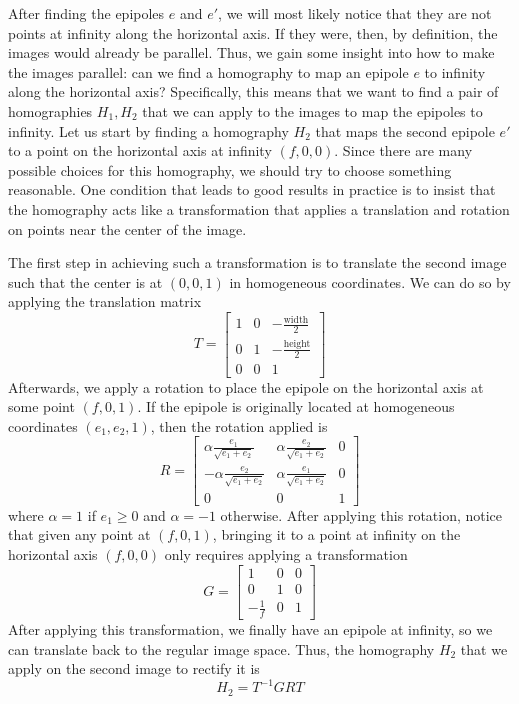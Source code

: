 \documentclass[a4paper, 12pt]{article}
\begin{document}
After finding the epipoles $e$ and $e'$, we will most likely notice that they are not points at infinity along the horizontal axis. If they were, then, by definition, the images would already be parallel. Thus, we gain some insight into how to make the images parallel: can we find a homography to map an epipole $e$ to infinity along the horizontal axis? Specifically, this means that we want to find a pair of homographies $H_1, H_2$ that we can apply to the images to map the epipoles to infinity. Let us start by finding a homography $H_2$ that maps the second epipole $e'$ to a  point on the horizontal axis at infinity $(f,0,0)$. Since there are many possible choices for this homography, we should try to choose something reasonable. One condition that leads to good results in practice is to insist that the homography acts like a transformation that applies a translation and rotation on points near the center of the image. 

The first step in achieving such a transformation is to translate the second image such that the center is at $(0,0,1)$ in homogeneous coordinates. We can do so by applying the translation matrix
\begin{equation}
    T = \begin{bmatrix}
    1&0&-\frac{\mathrm{width}}{2}\\0&1&-\frac{\mathrm{height}}{2}\\ 0 &0 &1
    \end{bmatrix}
\end{equation}
Afterwards, we apply a rotation to place the epipole on the horizontal axis at some point $(f,0,1)$. If the epipole is originally located at homogeneous coordinates $(e_1, e_2, 1)$, then the rotation applied is
\begin{equation}
    R = 
    \begin{bmatrix}
        \alpha\frac{e_1}{\sqrt{e_1+e_2}} & \alpha\frac{e_2}{\sqrt{e_1+e_2}} & 0 \\ -\alpha\frac{e_2}{\sqrt{e_1+e_2}} &\alpha \frac{e_1}{\sqrt{e_1+e_2}} & 0\\ 0&0&1
    \end{bmatrix}
\end{equation}
where $\alpha=1$ if $e_1\geq 0$ and $\alpha=-1$ otherwise. After applying this rotation, notice that given any point at $(f,0,1)$, bringing it to a point at infinity on the horizontal axis $(f,0,0)$ only requires applying a transformation
\begin{equation}
    G =
    \begin{bmatrix}
    1 & 0 &0 \\ 0 & 1 & 0 \\ -\frac{1}{f} & 0 & 1
    \end{bmatrix}
\end{equation}
After applying this transformation, we finally have an epipole at infinity, so we can translate back to the regular image space. Thus, the homography $H_2$ that we apply on the second image to rectify it is 
\begin{equation}
    H_2 = T^{-1}GRT 
\end{equation}
\end{document}
